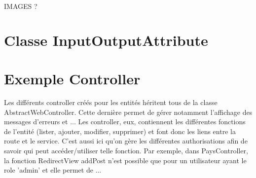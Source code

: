 			IMAGES ?

	\section{Classe InputOutputAttribute}


	\section{Exemple Controller}


		Les différents controller créés pour les entités héritent tous de la classe AbstractWebController.
		Cette dernière permet de gérer notamment l'affichage des messages d'erreurs et ...
		Les controller, eux, contiennent les différentes fonctions de l'entité (lister, ajouter, modifier, supprimer) et font donc les liens entre la route et le service.
		C'est aussi ici qu'on gère les différentes authorisations afin de savoir qui peut accéder/utiliser telle fonction.
		Par exemple, dans PaysController, la fonction RedirectView addPost n'est possible que pour un utilisateur ayant le role 'admin' et elle permet de ...
